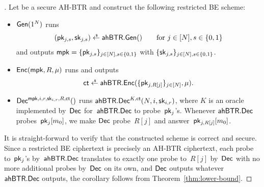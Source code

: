 \begin{proof}[]
Let
be a secure AH-BTR and
construct the following restricted BE scheme:
\begin{itemize}
\item $\Gen(1^N)$ runs
\begin{align*}
(\pk_{j,s},\sk_{j,s})\draws\AHBTR.\Gen()\qquad\textup{for }j\in[N],s\in\bit
\end{align*}
and outputs ${\mpk=\{\pk_{j,s}\}_{j\in[N],s\in\bit}}$ with $\{\sk_{j,s}\}_{j\in[N],s\in\bit}$.
\item $\Enc(\mpk,R,\mu)$ runs and outputs
\begin{align*}
\ct\draws\AHBTR.\Enc(\{\pk_{j,R[j]}\}_{j\in[N]},\mu).
\end{align*}
\item $\Dec^{\mpk,i,r,\sk_{i,r},R,\ct}()$
runs $\AHBTR.\Dec^{K,\ct}(N,i,\sk_{i,r})$,
where $K$ is an oracle implemented by~$\Dec$ for~$\AHBTR.\Dec$ to probe~$\pk_j$'s.
Whenever $\AHBTR.\Dec$ probes~$\pk_j[m_0]$,
we make $\Dec$ probe~$R[j]$ and answer~$\pk_{j,R[j]}[m_0]$.
\end{itemize}
It is straight-forward to verify that the constructed scheme is correct and secure.
Since
a restricted BE ciphertext is precisely an AH-BTR ciphertext,
each probe to~$\pk_j$'s by~$\AHBTR.\Dec$ translates to exactly one probe to~$R[j]$ by~$\Dec$ with no more additional probes by~$\Dec$ on its own, and
$\Dec$ outputs whatever $\AHBTR.\Dec$ outputs,
the corollary follows from Theorem~\ref{thm:lower-bound}.
\end{proof}
